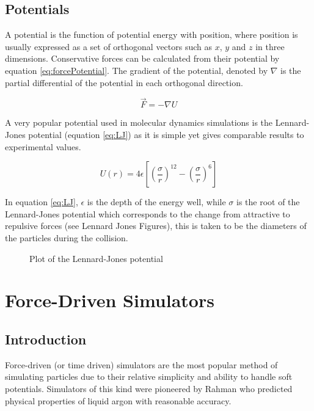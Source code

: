 \documentclass[12pt]{UoAthesis}
\begin{document}
\subsection{Potentials}
A potential is the function of potential energy with position, where
position is usually expressed as a set of orthogonal vectors such as
$x$, $y$ and $z$ in three dimensions. Conservative forces can be
calculated from their potential by equation
\ref{eq:forcePotential}. The gradient of the potential, denoted by
$\nabla$ is the partial differential of the potential in each
orthogonal direction.

\begin{equation}
  \vec{F}=-\nabla U \label{eq:forcePotential}
\end{equation}

A very popular potential used in molecular dynamics simulations is the
Lennard-Jones potential \cite{Lennard-Jones1924} (equation
\ref{eq:LJ}) as it is simple yet gives comparable results to
experimental values.

\begin{equation}
  U(r) = 4 \epsilon \left[ \left( \frac{\sigma}{r} \right)^{12} - \left( \frac{\sigma}{r} \right)^{6} \right] \label{eq:LJ}
\end{equation}

In equation \ref{eq:LJ}, $\epsilon$ is the depth of the energy well,
while $\sigma$ is the root of the Lennard-Jones potential which
corresponds to the change from attractive to repulsive forces (see
Lennard Jones Figures), this is taken to be the diameters of the
particles during the collision.
\begin{figure}
\begin{center}

\caption{Plot of the Lennard-Jones potential}
\label{fig:ljPot}
\end{center}
\end{figure}
\section{Force-Driven Simulators}
\subsection{Introduction}
Force-driven (or time driven) simulators are the most popular method
of simulating particles due to their relative simplicity and ability
to handle soft potentials.  Simulators of this kind were pioneered by
Rahman \cite{Rahman1964} who predicted physical properties of liquid
argon with reasonable accuracy.
\end{document}
